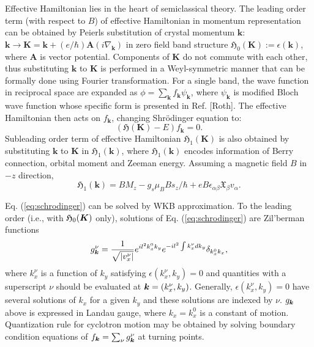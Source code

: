 \documentclass[aps, prb, showpacs, twocolumn, notitlepage, superscriptaddress]{revtex4-1}
\begin{document}
Effective Hamiltonian lies in the heart of semiclassical theory. The leading order term (with respect to $B$) of effective Hamiltonian in momentum representation can be obtained by Peierls substitution of crystal momentum $\boldsymbol{k}$: $\boldsymbol{k}\to\boldsymbol{K}=\boldsymbol{k}+(e/\hbar)\boldsymbol{A}(i\nabla_{\boldsymbol{k}})$ in zero field band structure $\mathfrak{H}_{0}(\boldsymbol{K}):=\epsilon(\boldsymbol{k})$, where $\boldsymbol{A}$ is vector potential. Components of $\boldsymbol{K}$ do not commute with each other, thus substituting $\boldsymbol{k}$ to $\boldsymbol{K}$ is performed in a Weyl-symmetric manner that can be formally done using Fourier transformation. For a single band, the wave function in reciprocal space are expanded as $\phi=\sum_{\boldsymbol{k}}f_{\boldsymbol{k}}\psi_{\boldsymbol{k}}$, where $\psi_{\boldsymbol{k}}$ is modified Bloch wave function whose specific form is presented in Ref. [Roth]. The effective Hamiltonian then acts on $f_{\boldsymbol{k}}$, changing Shr\"odinger equation to:
\begin{equation}
(\mathfrak{H}(\boldsymbol{K})-E)f_{\boldsymbol{k}}=0.\label{eq:schrodinger}
\end{equation}
Subleading order term of effective Hamiltonian $\mathfrak{H}_{1}(\boldsymbol{K})$ is also obtained by substituting $\boldsymbol{k}$ to $\boldsymbol{K}$ in $\mathfrak{H}_{1}(\boldsymbol{k})$, where $\mathfrak{H}_{1}(\boldsymbol{k})$ encodes information of Berry connection, orbital moment and Zeeman energy. Assuming a magnetic field $B$ in $-z$ direction,
\begin{equation}
\mathfrak{H}_{1}(\boldsymbol{k})=BM_{z}-g_s\mu_{B}Bs_z/\hbar+eB\epsilon_{\alpha\beta}\mathfrak{X}_{\beta}v_{\alpha}.
\end{equation}

Eq. (\ref{eq:schrodinger}) can be solved by WKB approximation. To the leading order (i.e., with $\mathfrak{H}_0(\boldsymbol{K})$ only), solutions of Eq. (\ref{eq:schrodinger}) are Zil'berman functions
\begin{equation}
g_{\boldsymbol{k}}^\nu=\frac{1}{\sqrt{|v_x^\nu|}}e^{il^2k_x^0k_y}e^{-il^{2}\int k_x^\nu dk_y}\delta_{k_x^0 k_x},
\end{equation}
where $k_x^\nu$ is a function of $k_y$ satisfying $\epsilon(k_x^\nu,k_y)=0$ and quantities with a superscript $\nu$ should be evaluated at $\boldsymbol{k} = (k_x^\nu, k_y)$. Generally, $\epsilon(k_x^\nu,k_y)=0$ have several solutions of $k_x$ for a given $k_y$ and these solutions are indexed by $\nu$. $g_{\boldsymbol{k}}$ above is expressed in Landau gauge, where $k_x=k_x^0$ is a constant of motion. Quantization rule for cyclotron motion may be obtained by solving boundary condition equations of $f_{\boldsymbol{k}} = \sum_\nu g_{\boldsymbol{k}}^\nu$ at turning points.
\end{document}
